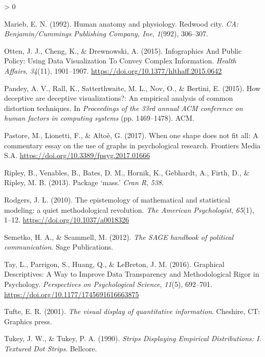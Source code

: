 \documentclass[
  english,
  man]{apa6}
\newlength{\cslhangindent}
\newenvironment{CSLReferences}[2] %
 {%
  \setlength{\parindent}{0pt}
  \ifodd #1 \everypar{\setlength{\hangindent}{\cslhangindent}}\ignorespaces\fi
  \ifnum #2 > 0
  \setlength{\parskip}{#2\baselineskip}
  \fi
 }%
 {}
\begin{document}
\begin{CSLReferences}{1}{0}
\leavevmode\hypertarget{ref-marieb1992human}{}%
Marieb, E. N. (1992). Human anatomy and physiology. Redwood city. \emph{CA: Benjamin/Cummings Publishing Company, Ine}, \emph{1}(992), 306--307.

\leavevmode\hypertarget{ref-Otten2015}{}%
Otten, J. J., Cheng, K., \& Drewnowski, A. (2015). {Infographics And Public Policy: Using Data Visualization To Convey Complex Information}. \emph{Health Affairs}, \emph{34}(11), 1901--1907. \url{https://doi.org/10.1377/hlthaff.2015.0642}

\leavevmode\hypertarget{ref-pandey2015deceptive}{}%
Pandey, A. V., Rall, K., Satterthwaite, M. L., Nov, O., \& Bertini, E. (2015). How deceptive are deceptive visualizations?: An empirical analysis of common distortion techniques. In \emph{Proceedings of the 33rd annual ACM conference on human factors in computing systems} (pp. 1469--1478). ACM.

\leavevmode\hypertarget{ref-Pastore2017}{}%
Pastore, M., Lionetti, F., \& Altoè, G. (2017). {When one shape does not fit all: A commentary essay on the use of graphs in psychological research}. Frontiers Media S.A. \url{https://doi.org/10.3389/fpsyg.2017.01666}

\leavevmode\hypertarget{ref-ripley2013package}{}%
Ripley, B., Venables, B., Bates, D. M., Hornik, K., Gebhardt, A., Firth, D., \& Ripley, M. B. (2013). Package {`mass.'} \emph{Cran R}, \emph{538}.

\leavevmode\hypertarget{ref-rodgers_epistemology_2010}{}%
Rodgers, J. L. (2010). {The epistemology of mathematical and statistical modeling: a quiet methodological revolution}. \emph{The American Psychologist}, \emph{65}(1), 1--12. \url{https://doi.org/10.1037/a0018326}

\leavevmode\hypertarget{ref-semetko2012sage}{}%
Semetko, H. A., \& Scammell, M. (2012). \emph{The SAGE handbook of political communication}. Sage Publications.

\leavevmode\hypertarget{ref-Tay2016a}{}%
Tay, L., Parrigon, S., Huang, Q., \& LeBreton, J. M. (2016). {Graphical Descriptives: A Way to Improve Data Transparency and Methodological Rigor in Psychology}. \emph{Perspectives on Psychological Science}, \emph{11}(5), 692--701. \url{https://doi.org/10.1177/1745691616663875}

\leavevmode\hypertarget{ref-Tufte2001}{}%
Tufte, E. R. (2001). \emph{The visual display of quantitative information}. Cheshire, CT: Graphics press.

\leavevmode\hypertarget{ref-Tukey1990}{}%
Tukey, J. W., \& Tukey, P. A. (1990). \emph{{Strips Displaying Empirical Distributions: I. Textured Dot Strips}}. Bellcore.


\end{CSLReferences}
\end{document}
